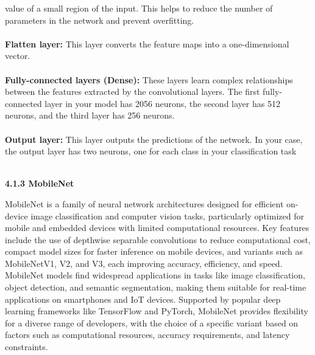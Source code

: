 \documentclass[12pt, English]{article}
\begin{document}
value of a small region of the input. This helps to reduce the number of parameters in the network and prevent overfitting.\\
\\
\textbf{Flatten layer: } This layer converts the feature maps into a one-dimensional vector.\\
\\
\textbf{Fully-connected layers (Dense): } These layers learn complex relationships between the features extracted by the convolutional layers. The first fully-connected layer in your model has 2056 neurons, the second layer has 512 neurons, and the third layer has 256 neurons.\\
\\
\textbf{Output layer: } This layer outputs the predictions of the network. In your case, the output layer has two neurons, one for each class in your classification task\\
\\
\begin{large}
\textbf{4.1.3 MobileNet }\\
\end{large}
\text MobileNet is a family of neural network architectures designed for efficient on-device image classification and computer vision tasks, particularly optimized for mobile and embedded devices with limited computational resources. Key features include the use of depthwise separable convolutions to reduce computational cost, compact model sizes for faster inference on mobile devices, and
variants such as MobileNetV1, V2, and V3, each improving accuracy, efficiency, and speed. MobileNet models find widespread applications in tasks like image classification, object detection, and semantic segmentation, making them suitable for real-time applications on smartphones and IoT devices. Supported by popular deep learning frameworks like TensorFlow and PyTorch, MobileNet provides
flexibility for a diverse range of developers, with the choice of a specific variant based on factors such as computational resources, accuracy requirements, and latency constraints.\\
\\
\end{document}
